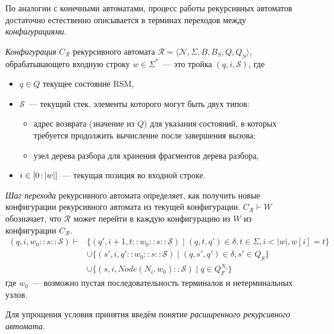 По аналогии с конечными автоматами, процесс работы рекурсивных автоматов достаточно естественно описывается в терминах переходов между \emph{конфигурациями}.

\begin{definition}
    \emph{Конфигурация} $C_{\mathcal{R}}$ рекурсивного автомата $\mathcal{R}=\langle \mathcal{N},\Sigma,B,B_S,Q,Q_S \rangle$, обрабатывающего входную строку $w \in \Sigma^*$~--- это тройка $(q,i,\mathcal{S})$, где
    \begin{itemize}
        \item $q \in Q$ текущее состояние RSM,
        \item $\mathcal{S}$~--- текущий стек, элементы которого могут быть двух типов:
              \begin{itemize}
                  \item адрес возврата (значение из $Q$) для указания состояний, в которых требуется продолжить вычисление после завершения вызова;
                  \item узел дерева разбора для хранения фрагментов дерева разбора,
              \end{itemize}
        \item $i \in [0 \rng |w|]$~--- текущая позиция во входной строке.
    \end{itemize}
\end{definition}

\begin{definition}\label{def:rsm_transition}
    \emph{Шаг перехода} рекурсивного автомата определяет, как получить новые конфигурации рекурсивного автомата из текущей конфигурации. $C_{\mathcal{R}} \vdash W$ обозначает, что $\mathcal{R}$ может перейти в каждую конфигурацию из $W$ из конфигурации $C_{\mathcal{R}}$.
    \begin{align*}
        (q,i,w_0::s::\mathcal{S})  \vdash & \{ (q',i+1,t::w_0::s::\mathcal{S}) \mid (q,t,q') \in \delta, t \in \Sigma, i < |w|, w[i] = t\}     \\
                                           & \cup \{(s', i, q'::w_0::s::\mathcal{S}) \mid (q,s',q') \in \delta, s' \in Q_S \} \\
                                           & \cup \{(s,i,\mathit{Node}(N_i, w_0)::\mathcal{S}) \mid q \in Q_F^{N_i}\}
    \end{align*}
    где $w_0$~--- возможно пустая последовательность терминалов и нетерминальных узлов.
\end{definition}

Для упрощения условия принятия введём понятие \textit{расширенного рекурсивного автомата}.

